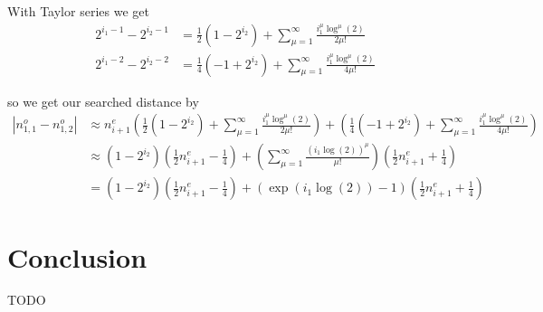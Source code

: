 \documentclass[12pt]{../document-templates/papers/one-column-mydashie/mydashie}
\newtheorem*{theorem A}{Theorem A}
\newtheorem*{theorem B}{N\"olker's Theorem}
\theoremstyle{remark}
\theoremstyle{remark}
\begin{document}
With Taylor series we get
\begin{equation}
    \begin{split}
        2^{i_{1} - 1} - 2^{i_{2} - 1} &= \frac{1}{2}\left(1 - 2^{i_{2}}\right) + \sum_{\mu = 1}^{\infty} \frac{i_{1}^{\mu}\log^{\mu}\left(2\right)}{2\mu!}\\
        2^{i_{1} - 2} - 2^{i_{2} - 2} &= \frac{1}{4}\left(-1 + 2^{i_{2}}\right) + \sum_{\mu = 1}^{\infty} \frac{i_{1}^{\mu}\log^{\mu}\left(2\right)}{4\mu!}
    \end{split}
\label{eq:taylor}
\end{equation}

so we get our searched distance by
\begin{equation}
    \begin{split}
        |n_{1,1}^{o} - n_{1,2}^{o}| &\approx n_{i+1}^{e}\left(\frac{1}{2}\left(1 - 2^{i_{2}}\right) + \sum_{\mu = 1}^{\infty} \frac{i_{1}^{\mu}\log^{\mu}\left(2\right)}{2\mu!}\right) + \left(\frac{1}{4}\left(-1 + 2^{i_{2}}\right) + \sum_{\mu = 1}^{\infty} \frac{i_{1}^{\mu}\log^{\mu}\left(2\right)}{4\mu!}\right)\\
            &\approx \left(1-2^{i_{2}}\right)\left(\frac{1}{2}n_{i+1}^{e} - \frac{1}{4}\right) + \left(\sum_{\mu = 1}^{\infty}\frac{\left(i_{1}\log\left(2\right)\right)^{\mu}}{\mu!}\right)\left(\frac{1}{2}n_{i+1}^{e} + \frac{1}{4}\right)\\
            &= \left(1 - 2^{i_{2}}\right)\left(\frac{1}{2}n_{i+1}^{e} - \frac{1}{4}\right) + \left(\exp\left(i_{1}\log\left(2\right)\right) - 1\right)\left(\frac{1}{2}n_{i+1}^{e} + \frac{1}{4}\right)
    \end{split}
\label{eq:samenumberapp_p2}
\end{equation}
\section{Conclusion}
\label{s:conclusion}
 TODO %
\end{document}
